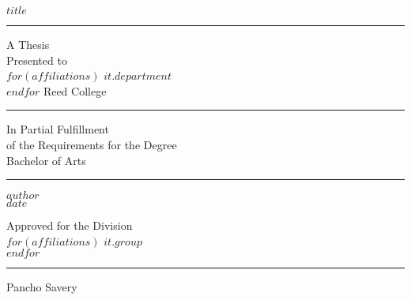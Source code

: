 %
%
%
%
%
%
%


\frontmatter
{}  %
\begin{center}
    $title$
    \vfil
    \hrule
    \vfil
    A Thesis \\
    Presented to \\
    $for(affiliations)$
    $it.department$ \\
    $endfor$
    Reed College
    \vfil
    \hrule
    \vfil
    In Partial Fulfillment \\
    of the Requirements for the Degree \\
    Bachelor of Arts
    \vfil
    \hrule
    \vfil
    $author$ \\
    $date$
    
    \cleardoublepage
    
    \vfil
    Approved for the Division \\
    $for(affiliations)$
    $it.group$ \\
    $endfor$
    
    \bigskip
    \bigskip
    \bigskip
    \hrule
    
    \medskip
    Pancho Savery
    \vfil
\end{center}

